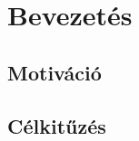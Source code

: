 \chapter{Bevezetés}
\label{chapIntroduction}

\pagebreak
\section{Motiváció}
\paragraph{}

\pagebreak
\section{Célkitűzés}
\paragraph{}

\pagebreak
